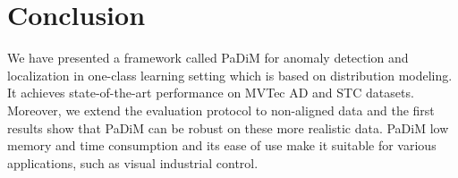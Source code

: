 \documentclass[a4paper,conference]{IEEEtran}
\begin{document}
\section{Conclusion}We  have  presented  a framework called PaDiM for  anomaly detection and localization in one-class learning setting which is based on distribution modeling. It achieves state-of-the-art performance on MVTec AD and STC datasets.
Moreover, we extend the evaluation  protocol to non-aligned data and the first results show that PaDiM can be robust on these more realistic data.
PaDiM low memory and time consumption and its ease of use make it suitable for various applications, such as visual industrial control. 










































\end{document}
